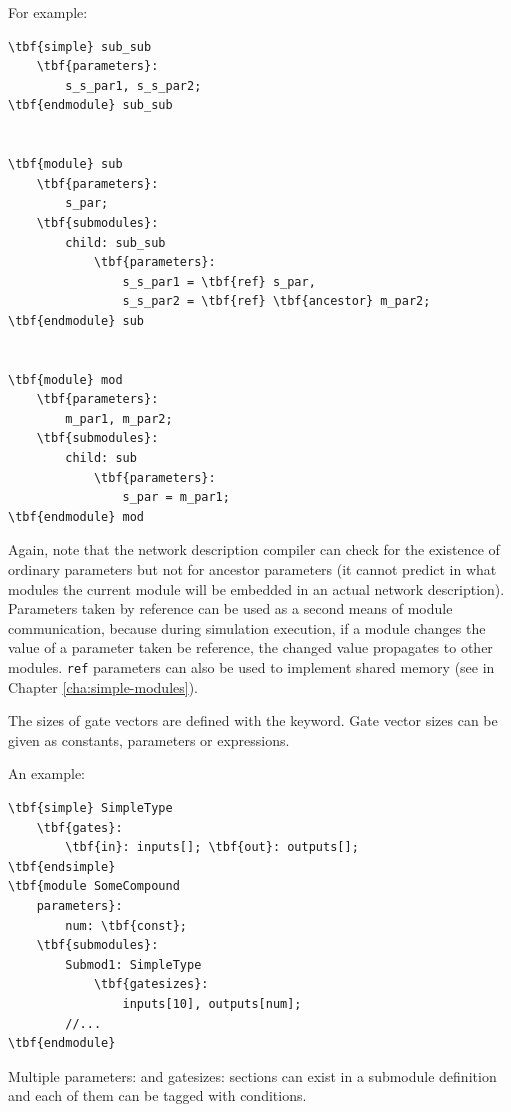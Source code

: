 For example:


\begin{Verbatim}[commandchars=\\\{\}]
\tbf{simple} sub_sub
    \tbf{parameters}:
        s_s_par1, s_s_par2;
\tbf{endmodule} sub_sub


\tbf{module} sub
    \tbf{parameters}:
        s_par;
    \tbf{submodules}:
        child: sub_sub
            \tbf{parameters}:
                s_s_par1 = \tbf{ref} s_par,
                s_s_par2 = \tbf{ref} \tbf{ancestor} m_par2;
\tbf{endmodule} sub


\tbf{module} mod
    \tbf{parameters}:
        m_par1, m_par2;
    \tbf{submodules}:
        child: sub
            \tbf{parameters}:
                s_par = m_par1;
\tbf{endmodule} mod
\end{Verbatim}


Again, note that the network description compiler can check for the
existence of ordinary parameters but not for ancestor parameters (it
cannot predict in what modules the current module will be embedded in
an actual network description).  Parameters taken by reference can be
used as a second means of module communication, because during
simulation execution, if a module changes the value of a parameter
taken be reference, the changed value propagates to other modules.
\texttt{ref} parameters can also be used to implement shared
memory (see in Chapter \ref{cha:simple-modules}).



The sizes of gate vectors are defined with the
 keyword.  Gate vector sizes
can be given as constants, parameters or expressions.

An example:


\begin{Verbatim}[commandchars=\\\{\}]
\tbf{simple} SimpleType
    \tbf{gates}:
        \tbf{in}: inputs[]; \tbf{out}: outputs[];
\tbf{endsimple}
\tbf{module SomeCompound
    parameters}:
        num: \tbf{const};
    \tbf{submodules}:
        Submod1: SimpleType
            \tbf{gatesizes}:
                inputs[10], outputs[num];
        //...
\tbf{endmodule}
\end{Verbatim}




Multiple parameters: and
gatesizes: sections can exist in a submodule
definition and each of them can be tagged with
conditions.

